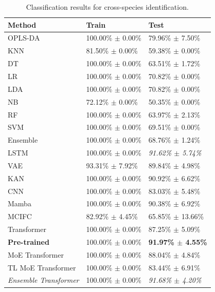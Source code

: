 \begin{table}[t]
    \centering
    \caption{Classification results for cross-species identification.}
    \label{tab:results_cross_species}
    \begin{tabular}{l|l|l}
        \hline
        Method & Train & Test \\
        \hline
        OPLS-DA & 100.00\% $\pm$ 0.00\% & 79.96\% $\pm$ 7.50\% \\
        KNN & 81.50\% $\pm$ 0.00\% & 59.38\% $\pm$ 0.00\% \\
        DT & 100.00\% $\pm$ 0.00\% & 63.51\% $\pm$ 1.72\% \\
        LR & 100.00\% $\pm$ 0.00\% & 70.82\% $\pm$ 0.00\% \\
        LDA & 100.00\% $\pm$ 0.00\% & 70.82\% $\pm$ 0.00\% \\
        NB & 72.12\% $\pm$ 0.00\% & 50.35\% $\pm$ 0.00\% \\
        RF & 100.00\% $\pm$ 0.00\% & 63.97\% $\pm$ 2.13\% \\
        SVM & 100.00\% $\pm$ 0.00\% & 69.51\% $\pm$ 0.00\% \\
        Ensemble & 100.00\% $\pm$ 0.00\% & 68.76\% $\pm$ 1.24\% \\
        LSTM & 100.00\% $\pm$ 0.00\% & \textit{91.62\% $\pm$ 5.74\%} \\
        VAE & 93.31\% $\pm$ 7.92\% & 89.84\% $\pm$ 4.98\% \\
        KAN & 100.00\% $\pm$ 0.00\% & 90.92\% $\pm$ 6.62\% \\
        CNN & 100.00\% $\pm$ 0.00\% & 83.03\% $\pm$ 5.48\% \\
        Mamba & 100.00\% $\pm$ 0.00\% & 90.38\% $\pm$ 6.92\% \\
        MCIFC & 82.92\% $\pm$ 4.45\% & 65.85\% $\pm$ 13.66\% \\
        Transformer & 100.00\% $\pm$ 0.00\% & 87.25\% $\pm$ 5.09\% \\
        \textbf{Pre-trained} & 100.00\% $\pm$ 0.00\% & \textbf{91.97\% $\pm$ 4.55\%} \\
        MoE Transformer & 100.00\% $\pm$ 0.00\% & 88.04\% $\pm$ 4.84\%  \\
        TL MoE Transformer & 100.00\% $\pm$ 0.00\% & 83.44\% $\pm$ 6.91\% \\
        \textit{Ensemble Transformer} & 100.00\% $\pm$ 0.00\% & \textit{91.68\% $\pm$ 4.20\%} \\ 
        \hline
    \end{tabular}
\end{table}

